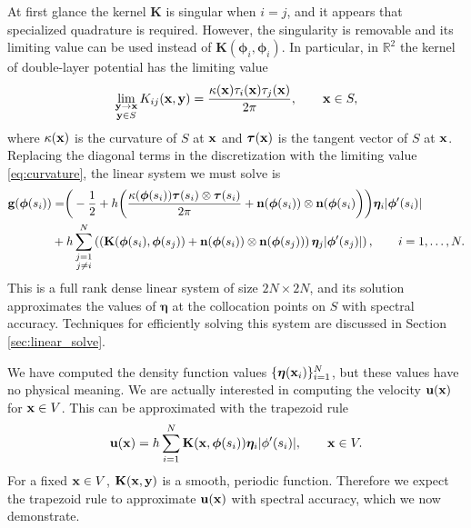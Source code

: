 At first glance the kernel $\mathbf{K}$ is singular when $i = j$, and it appears that specialized quadrature is required. However, the singularity is removable and its limiting value can be used instead of $\mathbf{K}(\bm{\phi}_i,\bm{\phi}_i)$. In particular, in $\mathbb{R}^2$  the kernel of  double-layer potential has the limiting value
\begin{equation}\label{eq:curvature}
\lim\limits_{\substack{{\mathbf{y}}\to{\mathbf{x}} \\ {\mathbf{y}}\in S}} K_{ij}({\mathbf{x}},{\mathbf{y}}) = \frac{\kappa({\mathbf{x}}) \tau_i({\mathbf{x}}) \tau_j({\mathbf{x}})}{2\pi},\qquad {\mathbf{x}}\in S,\end{equation}
where $\kappa({\mathbf{x}})$ is the curvature of $S$ at ${\mathbf{x}}$ and $\bm{\tau}({\mathbf{x}})$ is the tangent vector of $S$ at ${\mathbf{x}}$. Replacing  the diagonal terms in the discretization  with the limiting value \eqref{eq:curvature}, the linear system we must solve is
\begin{equation}\label{eq:interior_discrete}
\begin{aligned}\mathbf{g}(\bm{\phi}(s_i)) &= \biggr(-\frac{1}{2} + h \bigg(\frac{\kappa(\bm{\phi}(s_i)) \bm{\tau}(s_i)\otimes\bm{\tau}(s_i)}{2\pi} + {\mathbf{n}}(\bm{\phi}(s_i))\otimes{\mathbf{n}}(\bm{\phi}(s_i)\bigg)\biggr)\bm{\eta}_i |\bm{\phi}'(s_i)|\\&+ h\sum_{\substack{j=1\\ j\ne i}}^{N}\left(\left( \mathbf{K}(\bm{\phi}(s_i),\bm{\phi}(s_j))+ {\mathbf{n}}(\bm{\phi}(s_i))\otimes{\mathbf{n}}(\bm{\phi}(s_j))\right)\bm{\eta}_j|\bm{\phi}'(s_j)| \right),\qquad i=1,\hdots,N.
\end{aligned}
\end{equation}
This is a full rank dense linear system of size $2N\times 2N$, and its solution approximates the values of $\bm{\eta}$ at the collocation points on $S$ with spectral accuracy. Techniques for efficiently solving this system are discussed in Section \ref{sec:linear_solve}. 

We have computed the density function values $\{\bm{\eta}({\mathbf{x}}_i)\}_{i=1}^N$, but these values have no physical meaning. We are actually interested in computing the velocity ${\mathbf{u}}({\mathbf{x}})$ for ${\mathbf{x}}\in V$. This can be approximated with the trapezoid rule
\begin{equation}\label{eq:dlp_discrete} {\mathbf{u}}({\mathbf{x}}) = h\sum\limits_{i=1}^N \mathbf{K}({\mathbf{x}}, \bm{\phi}(s_i))\bm{\eta}_i|\phi'(s_i)|,\qquad {\mathbf{x}}\in V.\end{equation}
For a fixed ${\mathbf{x}}\in V$, $\mathbf{K}({\mathbf{x}},{\mathbf{y}})$ is a smooth, periodic function. Therefore we expect the trapezoid rule to approximate ${\mathbf{u}}({\mathbf{x}})$ with spectral accuracy, which we now demonstrate.

